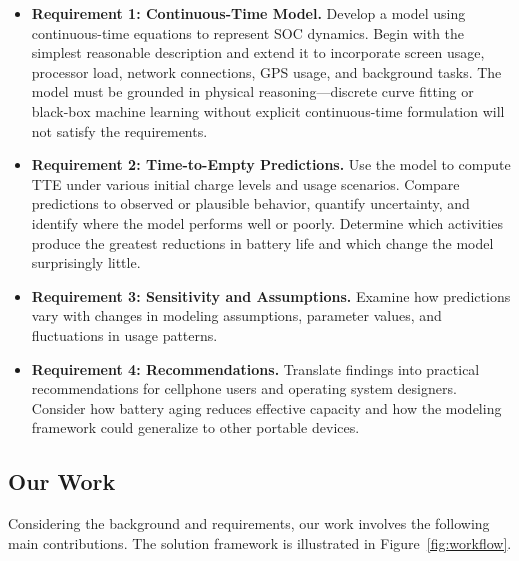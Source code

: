 \documentclass{mcmthesis}
\begin{document}
\begin{itemize}[noitemsep]
  \item \textbf{Requirement 1: Continuous-Time Model.} Develop a model using continuous-time equations to represent SOC dynamics. Begin with the simplest reasonable description and extend it to incorporate screen usage, processor load, network connections, GPS usage, and background tasks. The model must be grounded in physical reasoning---discrete curve fitting or black-box machine learning without explicit continuous-time formulation will not satisfy the requirements.

  \item \textbf{Requirement 2: Time-to-Empty Predictions.} Use the model to compute TTE under various initial charge levels and usage scenarios. Compare predictions to observed or plausible behavior, quantify uncertainty, and identify where the model performs well or poorly. Determine which activities produce the greatest reductions in battery life and which change the model surprisingly little.

  \item \textbf{Requirement 3: Sensitivity and Assumptions.} Examine how predictions vary with changes in modeling assumptions, parameter values, and fluctuations in usage patterns.

  \item \textbf{Requirement 4: Recommendations.} Translate findings into practical recommendations for cellphone users and operating system designers. Consider how battery aging reduces effective capacity and how the modeling framework could generalize to other portable devices.
\end{itemize}

\subsection{Our Work}

Considering the background and requirements, our work involves the following main contributions. The solution framework is illustrated in Figure~\ref{fig:workflow}.
\end{document}
